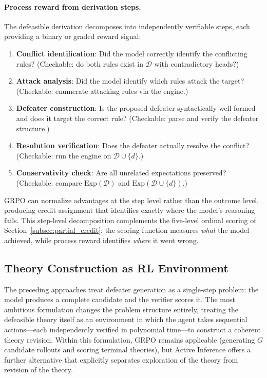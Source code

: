 \documentclass{article}
\theoremstyle{definition}
\newcommand{\D}{\mathcal{D}}
\newcommand{\Exp}{\mathrm{Exp}}
\begin{document}
\paragraph{Process reward from derivation steps.} The defeasible derivation decomposes into independently verifiable steps, each providing a binary or graded reward signal:
\begin{enumerate}[nosep]
    \item \textbf{Conflict identification}: Did the model correctly identify the conflicting rules? (Checkable: do both rules exist in $\D$ with contradictory heads?)
    \item \textbf{Attack analysis}: Did the model identify which rules attack the target? (Checkable: enumerate attacking rules via the engine.)
    \item \textbf{Defeater construction}: Is the proposed defeater syntactically well-formed and does it target the correct rule? (Checkable: parse and verify the defeater structure.)
    \item \textbf{Resolution verification}: Does the defeater actually resolve the conflict? (Checkable: run the engine on $\D \cup \{d\}$.)
    \item \textbf{Conservativity check}: Are all unrelated expectations preserved? (Checkable: compare $\Exp(\D)$ and $\Exp(\D \cup \{d\})$.)
\end{enumerate}
GRPO can normalize advantages at the step level rather than the outcome level, producing credit assignment that identifies exactly where the model's reasoning fails. This step-level decomposition complements the five-level ordinal scoring of Section~\ref{subsec:partial_credit}: the scoring function measures \emph{what} the model achieved, while process reward identifies \emph{where} it went wrong.


\subsection{Theory Construction as RL Environment}\label{subsec:theory_mdp}

The preceding approaches treat defeater generation as a single-step problem: the model produces a complete candidate and the verifier scores it. The most ambitious formulation changes the problem structure entirely, treating the defeasible theory itself as an environment in which the agent takes sequential actions---each independently verified in polynomial time---to construct a coherent theory revision. Within this formulation, GRPO remains applicable (generating $G$ candidate rollouts and scoring terminal theories), but Active Inference offers a further alternative that explicitly separates exploration of the theory from revision of the theory.
\end{document}
